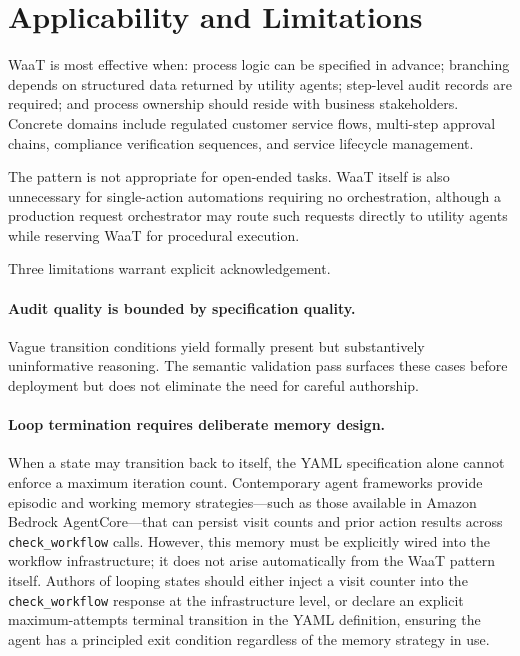 \documentclass[10pt,conference]{IEEEtran}
\begin{document}
\section{Applicability and Limitations}
\label{sec:applicability}

WaaT is most effective when: process logic can be specified in
advance; branching depends on structured data returned by utility
agents; step-level audit records are required; and process
ownership should reside with business stakeholders.  Concrete
domains include regulated customer service flows, multi-step
approval chains, compliance verification sequences, and service
lifecycle management.

The pattern is not appropriate for open-ended tasks.  WaaT itself
is also unnecessary for single-action automations requiring no
orchestration, although a production request orchestrator may route
such requests directly to utility agents while reserving WaaT for
procedural execution.

Three limitations warrant explicit acknowledgement.

\paragraph{Audit quality is bounded by specification quality.}
Vague transition conditions yield formally present but
substantively uninformative reasoning.  The semantic validation
pass surfaces these cases before deployment but does not
eliminate the need for careful authorship.

\paragraph{Loop termination requires deliberate memory design.}
When a state may transition back to itself, the YAML specification
alone cannot enforce a maximum iteration count.  Contemporary agent
frameworks provide episodic and working memory strategies---such as
those available in Amazon Bedrock AgentCore---that can persist
visit counts and prior action results across \texttt{check\_workflow}
calls.  However, this memory must be explicitly wired into the
workflow infrastructure; it does not arise automatically from the
WaaT pattern itself.  Authors of looping states should either
inject a visit counter into the \texttt{check\_workflow} response
at the infrastructure level, or declare an explicit maximum-attempts
terminal transition in the YAML definition, ensuring the agent has
a principled exit condition regardless of the memory strategy in
use.
\end{document}
